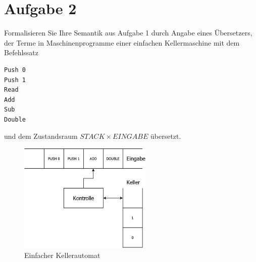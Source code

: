 \documentclass[ngerman,a4paper]{report}
\begin{document}
\section*{Aufgabe 2}
Formalisieren Sie Ihre Semantik aus Aufgabe 1 durch Angabe eines Übersetzers, der Terme in Maschinenprogramme einer einfachen Kellermaschine mit dem Befehlssatz
\begin{lstlisting}
Push 0
Push 1
Read
Add
Sub
Double
\end{lstlisting}
und dem Zustandsraum $STACK \times EINGABE$ übersetzt.\\
\begin{figure}
	\centering
	\includegraphics[width=240px]{../../gfx/einfacheKellermaschine.png}
	\caption{Einfacher Kellerautomat}\label{gfx:ekeller}
\end{figure}
\end{document}
